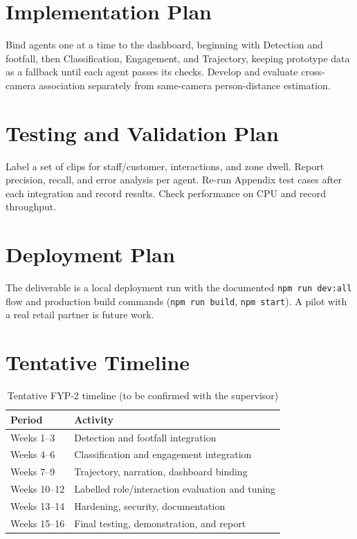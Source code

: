 \section{Implementation Plan}
Bind agents one at a time to the dashboard, beginning with Detection and footfall, then Classification, Engagement, and Trajectory, keeping prototype data as a fallback until each agent passes its checks. Develop and evaluate cross-camera association separately from same-camera person-distance estimation.

\section{Testing and Validation Plan}
Label a set of clips for staff/customer, interactions, and zone dwell. Report precision, recall, and error analysis per agent. Re-run Appendix test cases after each integration and record results. Check performance on CPU and record throughput.

\section{Deployment Plan}
The deliverable is a local deployment run with the documented \texttt{npm run dev:all} flow and production build commands (\texttt{npm run build}, \texttt{npm start}). A pilot with a real retail partner is future work.

\section{Tentative Timeline}
\begin{table}[H]
\centering
\caption{Tentative FYP-2 timeline (to be confirmed with the supervisor)}
\begin{tabular}{P{0.2\textwidth}P{0.67\textwidth}}
\toprule
Period & Activity\\
\midrule
Weeks 1--3 & Detection and footfall integration\\
Weeks 4--6 & Classification and engagement integration\\
Weeks 7--9 & Trajectory, narration, dashboard binding\\
Weeks 10--12 & Labelled role/interaction evaluation and tuning\\
Weeks 13--14 & Hardening, security, documentation\\
Weeks 15--16 & Final testing, demonstration, and report\\
\bottomrule
\end{tabular}
\end{table}

